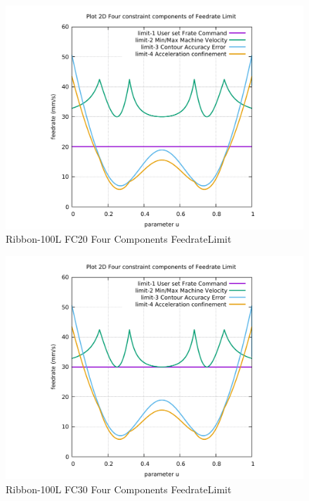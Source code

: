 \begin{figure}
	\caption     {Ribbon-100L FC20 Four Components FeedrateLimit}
	\label{32-img-Ribbon-100L-FC20-Four-Components-FeedrateLimit.pdf}
\includegraphics[width=1.00\textwidth]{Chap4/appendix/app-Ribbon-100L/plots/32-img-Ribbon-100L-FC20-Four-Components-FeedrateLimit.pdf}
\end{figure}


\clearpage
\pagebreak

\begin{figure}
	\caption     {Ribbon-100L FC30 Four Components FeedrateLimit}
	\label{33-img-Ribbon-100L-FC30-Four-Components-FeedrateLimit.pdf}
\includegraphics[width=1.00\textwidth]{Chap4/appendix/app-Ribbon-100L/plots/33-img-Ribbon-100L-FC30-Four-Components-FeedrateLimit.pdf}
\end{figure}


